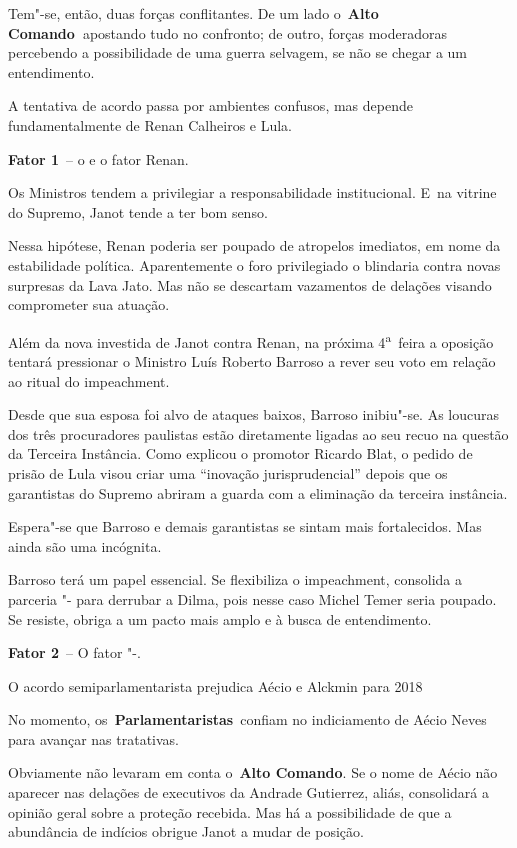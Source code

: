 Tem"-se, então, duas forças conflitantes. De um lado o~\textbf{Alto
Comando~}apostando tudo no confronto; de outro, forças moderadoras
percebendo a possibilidade de uma guerra selvagem, se não se chegar a um
entendimento.

A tentativa de acordo passa por ambientes confusos, mas depende
fundamentalmente de Renan Calheiros e Lula.

\textbf{Fator 1}~-- o  e o fator Renan.

Os Ministros tendem a privilegiar a responsabilidade institucional. E~na
vitrine do Supremo, Janot tende a ter bom senso.

Nessa hipótese, Renan poderia ser poupado de atropelos imediatos, em
nome da estabilidade política. Aparentemente o foro privilegiado o
blindaria contra novas surpresas da Lava Jato. Mas não se descartam
vazamentos de delações visando comprometer sua atuação.

Além da nova investida de Janot contra Renan, na próxima
4\textsuperscript{a}~feira a oposição tentará pressionar o Ministro Luís
Roberto Barroso a rever seu voto em relação ao ritual do impeachment.

Desde que sua esposa foi alvo de ataques baixos, Barroso inibiu"-se. As
loucuras dos três procuradores paulistas estão diretamente ligadas ao
seu recuo na questão da Terceira Instância. Como explicou o promotor
Ricardo Blat, o pedido de prisão de Lula visou criar uma ``inovação
jurisprudencial'' depois que os garantistas do Supremo abriram a guarda
com a eliminação da terceira instância.

Espera"-se que Barroso e demais garantistas se sintam mais fortalecidos.
Mas ainda são uma incógnita.

Barroso terá um papel essencial. Se flexibiliza o impeachment, consolida
a parceria "- para derrubar a Dilma, pois nesse caso Michel Temer
seria poupado. Se resiste, obriga a um pacto mais amplo e à busca de
entendimento.

\textbf{Fator 2}~-- O fator "-.

O acordo semiparlamentarista prejudica Aécio e Alckmin para 2018

No momento, os~\textbf{Parlamentaristas}~confiam no indiciamento de
Aécio Neves para avançar nas tratativas.

Obviamente não levaram em conta o~\textbf{Alto Comando}. Se o nome de
Aécio não aparecer nas delações de executivos da Andrade Gutierrez,
aliás, consolidará a opinião geral sobre a proteção recebida. Mas há a
possibilidade de que a abundância de indícios obrigue Janot a mudar de
posição.

